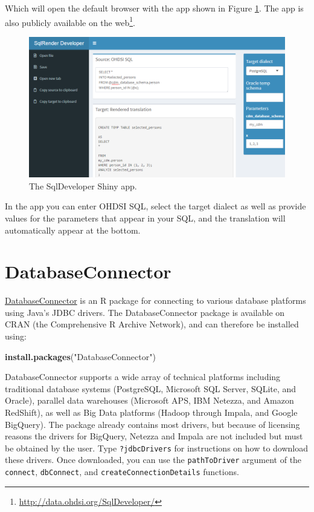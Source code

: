 \documentclass[11pt]{book}
\newenvironment{Shaded}{\begin{snugshade}}{\end{snugshade}}
\newcommand{\KeywordTok}[1]{\textcolor[rgb]{0.13,0.29,0.53}{\textbf{#1}}}
\newcommand{\NormalTok}[1]{#1}
\newcommand{\StringTok}[1]{\textcolor[rgb]{0.31,0.60,0.02}{#1}}
\let\rmarkdownfootnote\footnote%
\def\footnote{\protect\rmarkdownfootnote}
\theoremstyle{definition}
\theoremstyle{definition}
\theoremstyle{definition}
\theoremstyle{remark}
\begin{document}
Which will open the default browser with the app shown in Figure \ref{fig:sqlDeveloper}. The app is also publicly available on the web\footnote{\url{http://data.ohdsi.org/SqlDeveloper/}}.

\begin{figure}

{\centering \includegraphics[width=1\linewidth]{images/SqlAndR/sqlDeveloper} 

}

\caption{The SqlDeveloper Shiny app.}\label{fig:sqlDeveloper}
\end{figure}

In the app you can enter OHDSI SQL, select the target dialect as well as provide values for the parameters that appear in your SQL, and the translation will automatically appear at the bottom.

\hypertarget{DatabaseConnector}{%
\section{DatabaseConnector}\label{DatabaseConnector}}

\href{https://ohdsi.github.io/DatabaseConnector/}{DatabaseConnector} is an R package for connecting to various database platforms using Java's JDBC drivers. The DatabaseConnector package is available on CRAN (the Comprehensive R Archive Network), and can therefore be installed using:

\begin{Shaded}
\begin{Highlighting}[]
\KeywordTok{install.packages}\NormalTok{(}\StringTok{"DatabaseConnector"}\NormalTok{)}
\end{Highlighting}
\end{Shaded}

DatabaseConnector supports a wide array of technical platforms including traditional database systems (PostgreSQL, Microsoft SQL Server, SQLite, and Oracle), parallel data warehouses (Microsoft APS, IBM Netezza, and Amazon RedShift), as well as Big Data platforms (Hadoop through Impala, and Google BigQuery). The package already contains most drivers, but because of licensing reasons the drivers for BigQuery, Netezza and Impala are not included but must be obtained by the user. Type \texttt{?jdbcDrivers} for instructions on how to download these drivers. Once downloaded, you can use the \texttt{pathToDriver} argument of the \texttt{connect}, \texttt{dbConnect}, and \texttt{createConnectionDetails} functions.
\end{document}
